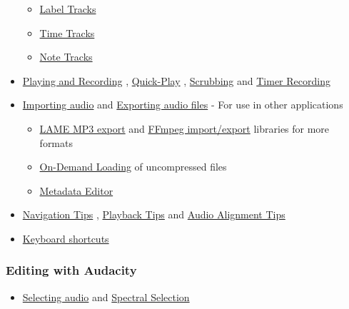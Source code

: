 \begin{multicols}{2}
\begin{itemize}
\begin{itemize}
\item 
\hyperref[\foo{man:label:tracks:}]{Label Tracks}

\item 
\hyperref[\foo{man:time:tracks:}]{Time Tracks}

\item 
\hyperref[\foo{man:note:tracks:}]{Note Tracks}

\end{itemize}

\item 
\hyperref[\foo{man:playing:and:recording:}]{Playing and Recording}
, 
\hyperref[\foo{man:timeline:tqp}]{Quick-Play}
, 
\hyperref[\foo{man:scrubbing:and:seeking:}]{Scrubbing}
 and 
\hyperref[\foo{man:timer:record:}]{Timer Recording}

\item 
\hyperref[\foo{man:importing:audio:}]{Importing audio}
 and 
\hyperref[\foo{man:exporting:audio:}]{Exporting audio files}
 - For use in other applications

\begin{itemize}
\item 
\hyperref[\foo{man:faq:installation:and:plug:ins:lame}]{LAME MP3 export}
 and 
\hyperref[\foo{man:faq:installation:and:plug:ins:ffdown}]{FFmpeg import/export}
 libraries for more formats
\item 
\hyperref[\foo{man:on:demand:loading:}]{On-Demand Loading}
 of uncompressed files
\item 
\hyperref[\foo{man:metadata:editor:}]{Metadata Editor}

\end{itemize}

\item 
\hyperref[\foo{man:navigation:tips:}]{Navigation Tips}
, 
\hyperref[\foo{man:playback:tips:}]{Playback Tips}
 and 
\hyperref[\foo{man:audio:alignment:tips:}]{Audio Alignment Tips}

\item 
\hyperref[\foo{man:keyboard:shortcut:reference:}]{Keyboard shortcuts}

\end{itemize}

\subsubsection{Editing with Audacity}
\begin{itemize}
\item 
\hyperref[\foo{man:audacity:selection:}]{Selecting audio}
 and 
\hyperref[\foo{man:spectral:selection:}]{Spectral Selection}


\end{itemize}
\end{multicols}
